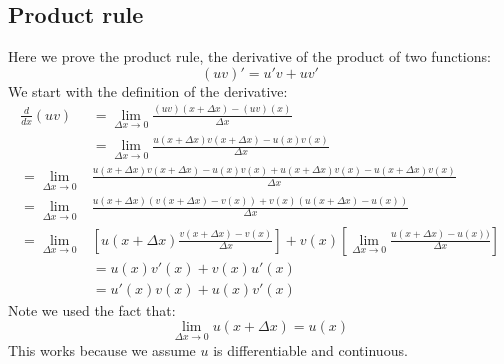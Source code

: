 \documentclass{report}
\begin{document}
\subsection{Product rule} %
Here we prove the product rule, the derivative of the product of two functions:
\begin{equation*}
(uv)'=u'v+uv'
\end{equation*}
We start with the definition of the derivative:
\begin{align*}
\frac{d}{dx}(uv)&=\lim_{\Delta x\to0}\frac{(uv)(x+\Delta x)-(uv)(x)}{\Delta x}\\
&=\lim_{\Delta x\to0}\frac{u(x+\Delta x)v(x+\Delta x)-u(x)v(x)}{\Delta x}\\
=\lim_{\Delta x\to0}&\frac{u(x+\Delta x)v(x+\Delta x)-u(x)v(x)
+u(x+\Delta x)v(x)-u(x+\Delta x)v(x)}{\Delta x}\\
=\lim_{\Delta x\to0}&\frac{u(x+\Delta x)(v(x+\Delta x)-v(x))
+v(x)(u(x+\Delta x)-u(x))}{\Delta x}\\
=\lim_{\Delta x\to0}&\left[u(x+\Delta x)\frac{v(x+\Delta x)-v(x)}{\Delta x}\right]
+v(x)\left[\lim_{\Delta x\to0}\frac{u(x+\Delta x)-u(x))}{\Delta x}\right]\\
&=u(x)v'(x)+v(x)u'(x)\\
&=u'(x)v(x)+u(x)v'(x)
\end{align*}
Note we used the fact that:
\begin{equation*}
\lim_{\Delta x\to0}u(x+\Delta x)=u(x)
\end{equation*}
This works because we assume $u$ is differentiable and continuous.
\newpage
\end{document}
